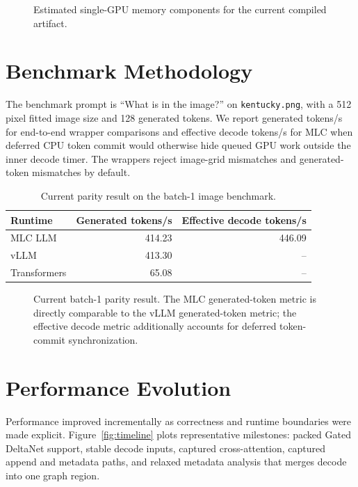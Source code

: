 \documentclass[10pt]{article}
\begin{document}
\begin{figure}[t]
  \centering
  
  \caption{Estimated single-GPU memory components for the current compiled
  artifact.}
  \label{fig:memory}
\end{figure}

\section{Benchmark Methodology}

The benchmark prompt is ``What is in the image?'' on \texttt{kentucky.png},
with a 512 pixel fitted image size and 128 generated tokens. We report
generated tokens/s for end-to-end wrapper comparisons and effective decode
tokens/s for MLC when deferred CPU token commit would otherwise hide queued GPU
work outside the inner decode timer. The wrappers reject image-grid mismatches
and generated-token mismatches by default.

\begin{table}[t]
  \centering
  \caption{Current parity result on the batch-1 image benchmark.}
  \label{tab:parity}
  \begin{tabular}{lrr}
    \toprule
    Runtime & Generated tokens/s & Effective decode tokens/s \\
    \midrule
    MLC LLM & 414.23 & 446.09 \\
    vLLM & 413.30 & -- \\
    Transformers & 65.08 & -- \\
    \bottomrule
  \end{tabular}
\end{table}

\begin{figure}[t]
  \centering
  
  \caption{Current batch-1 parity result. The MLC generated-token metric is
  directly comparable to the vLLM generated-token metric; the effective decode
  metric additionally accounts for deferred token-commit synchronization.}
  \label{fig:throughput}
\end{figure}

\section{Performance Evolution}

Performance improved incrementally as correctness and runtime boundaries were
made explicit. Figure~\ref{fig:timeline} plots representative milestones:
packed Gated DeltaNet support, stable decode inputs, captured cross-attention,
captured append and metadata paths, and relaxed metadata analysis that merges
decode into one graph region.
\end{document}
